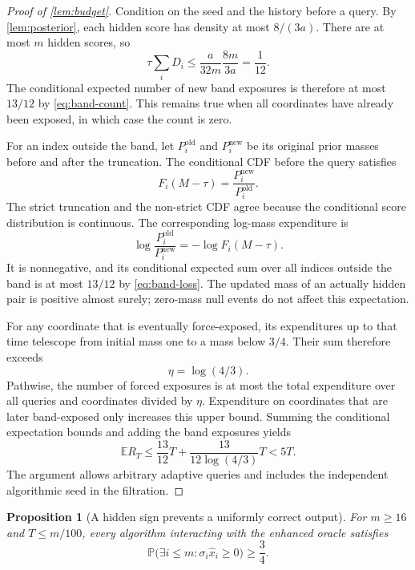 \documentclass[11pt]{article}
\newcommand{\E}{\mathbb{E}}
\newcommand{\Prob}{\mathbb{P}}
\newtheorem{proposition}[proposition]{Proposition}
\theoremstyle{definition}
\theoremstyle{remark}
\begin{document}
\begin{proof}[Proof of \cref{lem:budget}]
Condition on the seed and the history before a query.  By
\cref{lem:posterior}, each hidden score has density at most $8/(3a)$.
There are at most $m$ hidden scores, so
\[
 \tau\sum_iD_i
 \le\frac{a}{32m}\frac{8m}{3a}
 =\frac1{12}.
\]
The conditional expected number of new band exposures is therefore at
most $13/12$ by \cref{eq:band-count}.  This remains true when all
coordinates have already been exposed, in which case the count is zero.

For an index outside the band, let $P_i^{\mathrm{old}}$ and
$P_i^{\mathrm{new}}$ be its original prior masses before and after the
truncation.  The conditional CDF before the query satisfies
\[
 F_i(M-\tau)=\frac{P_i^{\mathrm{new}}}{P_i^{\mathrm{old}}}.
\]
The strict truncation and the non-strict CDF agree because the
conditional score distribution is continuous.  The corresponding
log-mass expenditure is
\[
 \log\frac{P_i^{\mathrm{old}}}{P_i^{\mathrm{new}}}
 =-\log F_i(M-\tau).
\]
It is nonnegative, and its conditional expected sum over all indices
outside the band is at most $13/12$ by \cref{eq:band-loss}.  The updated
mass of an actually hidden pair is positive almost surely; zero-mass
null events do not affect this expectation.

For any coordinate that is eventually force-exposed, its expenditures
up to that time telescope from initial mass one to a mass below
$3/4$.  Their sum therefore exceeds
\[
 \eta=\log(4/3).
\]
Pathwise, the number of forced exposures is at most the total
expenditure over all queries and coordinates divided by $\eta$.
Expenditure on coordinates that are later band-exposed only increases
this upper bound.  Summing the conditional expectation bounds and
adding the band exposures yields
\[
 \E R_T
 \le\frac{13}{12}T+\frac{13}{12\log(4/3)}T
 <5T.
\]
The argument allows arbitrary adaptive queries and includes the
independent algorithmic seed in the filtration.
\end{proof}

\begin{proposition}[A hidden sign prevents a uniformly correct output]
\label{prop:hidden-sign}
For $m\ge16$ and $T\le m/100$, every algorithm interacting with the
enhanced oracle satisfies
\[
 \Prob\bigl(\exists i\le m:\sigma_i\widehat x_i\ge0\bigr)
 \ge\frac34.
\]
\end{proposition}
\end{document}
